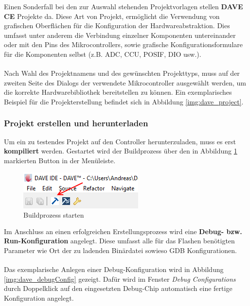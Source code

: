 Einen Sonderfall bei den zur Auswahl stehenden Projektvorlagen stellen \textbf{DAVE CE} Projekte da. Diese Art von Projekt, ermöglicht die Verwendung von grafischen Oberflächen für die Konfiguration der Hardwareabstraktion. Dies umfasst unter anderem die Verbindung einzelner Komponenten untereinander oder mit den Pins des Mikrocontrollers, sowie grafische Konfigurationsformulare für die Komponenten selbst (z.B. ADC, CCU, POSIF, DIO usw.). \\ \\
Nach Wahl des Projektnamens und des gewünschten Projekttyps, muss auf der zweiten Seite des Dialogs der verwendete Mikrocontroller ausgewählt werden, um die korrekte Hardwarebibliothek bereitstellen zu können. Ein exemplarisches Beispiel für die Projekterstellung befindet sich in Abbildung \ref{img:dave_project}. 

\subsubsection{Projekt erstellen und herunterladen}
Um ein zu testendes Projekt auf den Controller herunterzuladen, muss es erst \textbf{kompiliert} werden. Gestartet wird der Buildprozess über den in Abbildung \ref{img:dave_build} markierten Button in der Menüleiste. 

\begin{figure}[ht]
\centering
\includegraphics{sensor/dave_build.PNG}
\caption{Buildprozess starten}
\label{img:dave_build}
\end{figure}

\noindent
Im Anschluss an einen erfolgreichen Erstellungsprozess wird eine \textbf{Debug- bzw. Run-Konfiguration} angelegt. Diese umfasst alle für das Flashen benötigten Parameter wie Ort der zu ladenden Binärdatei sowieso GDB Konfigurationen.\\

\noindent
{} \\

\noindent
Das exemplarische Anlegen einer Debug-Konfiguration wird in Abbildung \ref{img:dave_debugConfig} gezeigt. Dafür wird im Fenster \textit{Debug Configurations} durch Doppelklick auf den eingesetzten Debug-Chip automatisch eine fertige Konfiguration angelegt.

